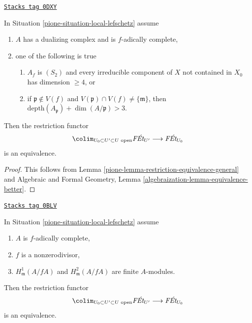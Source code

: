 \begin{lemma}
\label{pione-lemma-essentially-surjective-general-better}
\href{https://stacks.math.columbia.edu/tag/0DXY}{\texttt{Stacks tag 0DXY}}

In Situation \ref{pione-situation-local-lefschetz} assume
\begin{enumerate}
\item $A$ has a dualizing complex and is $f$-adically complete,
\item one of the following is true
\begin{enumerate}
\item $A_f$ is $(S_2)$ and every irreducible component of $X$
not contained in $X_0$ has dimension $\geq 4$, or
\item if $\mathfrak p \not \in V(f)$ and
$V(\mathfrak p) \cap V(f) \not = \{\mathfrak m\}$, then
$\text{depth}(A_\mathfrak p) + \dim(A/\mathfrak p) > 3$.
\end{enumerate}
\end{enumerate}
Then the restriction functor
$$
\colim_{U_0 \subset U' \subset U\text{ open}} \textit{F\'Et}_{U'}
\longrightarrow
\textit{F\'Et}_{U_0}
$$
is an equivalence.
\end{lemma}

\begin{proof}

This follows from Lemma \ref{pione-lemma-restriction-equivalence-general}
and
Algebraic and Formal Geometry, Lemma
\ref{algebraization-lemma-equivalence-better}.
\end{proof}

\begin{lemma}
\label{pione-lemma-essentially-surjective-general}
\href{https://stacks.math.columbia.edu/tag/0BLV}{\texttt{Stacks tag 0BLV}}

In Situation \ref{pione-situation-local-lefschetz} assume
\begin{enumerate}
\item $A$ is $f$-adically complete,
\item $f$ is a nonzerodivisor,
\item $H^1_\mathfrak m(A/fA)$ and $H^2_\mathfrak m(A/fA)$
are finite $A$-modules.
\end{enumerate}
Then the restriction functor
$$
\colim_{U_0 \subset U' \subset U\text{ open}} \textit{F\'Et}_{U'}
\longrightarrow
\textit{F\'Et}_{U_0}
$$
is an equivalence.
\end{lemma}

